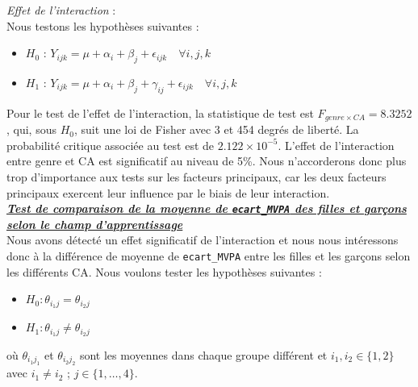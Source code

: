 \documentclass[12pt,a4paper]{article}
\begin{document}
\begin{enumerate}[label=\textbf{\alph*})]
	\textit{Effet de l'interaction} : \\
	Nous testons les hypothèses suivantes :
	\begin{itemize}[label=--, leftmargin=*]
		\item \textbf{$H_0$} : $Y_{ijk} = \mu + \alpha_i + \beta_j + \epsilon_{ijk} \quad \forall i,j,k$ 
		\item \textbf{$H_1$} : $Y_{ijk} = \mu + \alpha_i + \beta_j + \gamma_{ij} + \epsilon_{ijk} \quad \forall i,j,k$
	\end{itemize}
	
	Pour le test de l'effet de l'interaction, la statistique de test est $F_{genre \times CA} = 8.3252$, qui, sous $H_0$, suit une loi de Fisher avec 3 et 454 degrés de liberté. La probabilité critique associée au test est de $2.122 \times 10^{-5}$. L'effet de l'interaction entre genre et CA est significatif au niveau de 5\%. Nous n'accorderons donc plus trop d'importance aux tests sur les facteurs principaux, car les deux facteurs principaux exercent leur influence par le biais de leur interaction.\\
	
	\textbf{\textit{\underline{Test de comparaison  de la moyenne de \texttt{ecart\_MVPA} des filles et garçons selon le champ d'apprentissage}}} \\
	
	Nous avons détecté un effet significatif de l'interaction et nous nous intéressons donc à la différence de moyenne de \texttt{ecart\_MVPA} entre les filles et les garçons selon les différents CA. Nous voulons tester les hypothèses suivantes :	
	\begin{itemize}[label=--, leftmargin=*]
		\item $H_0 : \theta_{i_1j} = \theta_{i_2j}$
		\item $H_1 : \theta_{i_1j} \neq \theta_{i_2j}$
	\end{itemize}
	où $\theta_{i_1j_1}$ et $\theta_{i_2j_2}$ sont les moyennes dans chaque groupe différent et $i_1, i_2 \in \{1, 2\}$ avec $i_1 \neq i_2$ ; $j \in \{1, \ldots, 4\}$. \\
	

\end{enumerate}
\end{document}
